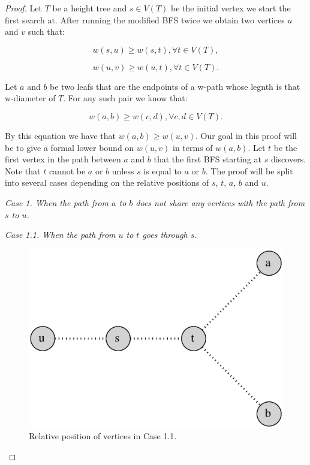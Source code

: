 \begin{proof}
Let $T$ be a height tree and $s \in V(T)$ be the initial vertex we start the first search at. After running the modified BFS twice we obtain two vertices $u$ and $v$ such that:

\begin{equation}
    \label{eq:su_all}
    w(s, u) \ge w(s, t), \forall t \in V(T),
\end{equation}

\begin{equation}
    \label{eq:uv_all}
    w(u, v) \ge w(u, t), \forall t \in V(T).
\end{equation}

Let $a$ and $b$ be two leafs that are the endpoints of a w-path whose legnth is that w-diameter of $T$. For any such pair we know that:

\begin{equation}
    \label{eq:ab_all}
    w(a, b) \ge w(c, d), \forall c, d \in V(T).
\end{equation}

By this equation we have that $w(a, b) \ge w(u, v)$. Our goal in this proof will be to give a formal lower bound on $w(u, v)$ in terms of $w(a, b)$. Let $t$ be the first vertex in the path between $a$ and $b$ that the first BFS starting at $s$ discovers. Note that $t$ cannot be $a$ or $b$ unless $s$ is equal to $a$ or $b$. The proof will be split into several cases depending on the relative positions of $s$, $t$, $a$, $b$ and $u$. \linebreak

{\em Case 1. When the path from $a$ to $b$ does not share any vertices with the path from $s$ to $u$.}

{\em Case 1.1. When the path from $u$ to $t$ goes through $s$.}

\begin{figure}[h]%
    \centering
    \includegraphics[center, scale=0.4]{./images/2xbfs-case-1-1.eps}
    \caption{Relative position of vertices in Case 1.1. }%
    \label{fig:case1.1}%
\end{figure}


\end{proof}
